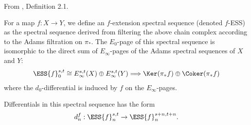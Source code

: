 \begin{definition}
\label{paper:2.1}
From \cite{LWX126}, Definition 2.1.\par
\label{def:ess}
  For a map $f: X\to Y$, we define an $f$-extension spectral sequence (denoted $f$-ESS) as the spectral sequence derived from filtering the above chain complex according to the Adams filtration on $\pi_*$. The $E_0$-page of this spectral sequence is isomorphic to the direct sum of $E_\infty$-pages of the Adams spectral sequences of $X$ and $Y$: 
  $$\ESS{f}_0^{s,t} \cong E_\infty^{s,t}(X) \oplus E_\infty^{s,t}(Y) \Longrightarrow \Ker(\pi_*f)\oplus \Coker(\pi_*f)$$
  where the $d_0$-differential is induced by $f$ on the $E_\infty$-pages.
  
  Differentials in this spectral sequence has the form
  $$d_n^{f}: \ESS{f}_n^{s,t}\to \ESS{f}_n^{s+n, t+n}.$$




\sketch
\end{definition}

